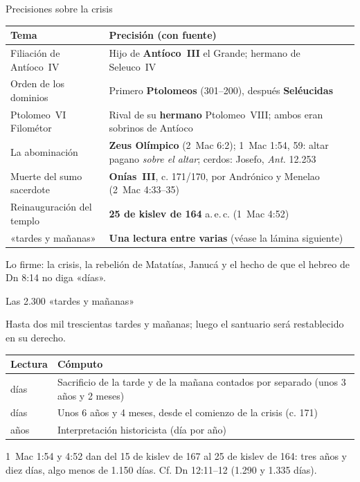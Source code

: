 \begin{frame}{Precisiones sobre la crisis}
\footnotesize\renewcommand{\arraystretch}{1.25}
\centering
\begin{tabular}{>{\RaggedRight\arraybackslash}p{3.7cm}>{\RaggedRight\arraybackslash}p{8.1cm}}
\toprule
\color{ladrillo}\bfseries Tema & \color{ladrillo}\bfseries Precisión (con fuente)\\\midrule
Filiación de Antíoco~IV & Hijo de \textbf{Antíoco~III} el Grande; hermano de Seleuco~IV\\
Orden de los dominios & Primero \textbf{Ptolomeos} (301--200), después \textbf{Seléucidas}\\
Ptolomeo~VI Filométor & Rival de su \textbf{hermano} Ptolomeo~VIII; ambos eran sobrinos de Antíoco\\
La abominación & \textbf{Zeus Olímpico} (2~Mac 6:2); 1~Mac 1:54, 59: altar pagano \emph{sobre el altar}; cerdos: Josefo, \emph{Ant.} 12.253\\
Muerte del sumo sacerdote & \textbf{Onías~III}, c. 171/170, por Andrónico y Menelao (2~Mac 4:33--35)\\
Reinauguración del templo & \textbf{25 de kislev de 164} a.\,e.\,c. (1~Mac 4:52)\\
2.300 «tardes y mañanas» & \textbf{Una lectura entre varias} (véase la lámina siguiente)\\
\bottomrule
\end{tabular}
\elabpropia
\begin{clave}Lo firme: la crisis, la rebelión de Matatías, Janucá y el hecho de que el hebreo de Dn 8:14 no diga «días».\end{clave}
\end{frame}

\begin{frame}{Las 2.300 «tardes y mañanas»}
\vspace{-4pt}\par
\begin{cita}Hasta dos mil trescientas tardes y mañanas; luego el santuario será restablecido en su derecho.\end{cita}
\footnotesize\renewcommand{\arraystretch}{1.25}
\begin{tabular}{>{\RaggedRight\arraybackslash}p{2.8cm}>{\RaggedRight\arraybackslash}p{8.7cm}}
\toprule
\color{ladrillo}\bfseries Lectura & \color{ladrillo}\bfseries Cómputo\\\midrule
1.150 días & Sacrificio de la tarde y de la mañana contados por separado (unos 3 años y 2 meses)\\
2.300 días & Unos 6 años y 4 meses, desde el comienzo de la crisis (c. 171)\\
2.300 años & Interpretación historicista (día por año)\\
\bottomrule
\end{tabular}
\elabpropia
\begin{notalam}[Precisión]
1~Mac 1:54 y 4:52 dan del 15 de kislev de 167 al 25 de kislev de 164: tres años y diez días, algo menos de 1.150 días. Cf. Dn 12:11--12 (1.290 y 1.335 días).
\end{notalam}
\end{frame}

